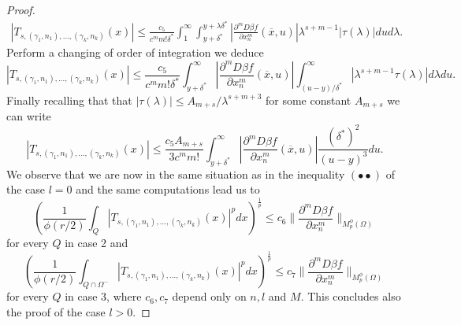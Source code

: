 \documentclass[12pt]{article}
\theoremstyle{definition}
\begin{document}
\begin{proof}
\begin{align*}
|T_{s,(\gamma_1,n_1),...,(\gamma_k,n_k)}(x) | \le \frac{c_5}{c^mm!\delta^*}\int_1^\infty \int_{y+\delta^*}^{y+\lambda \delta^*} \left|\frac{\partial^{m} D\beta f}{\partial x_n^{m} }(\overline x,u)\right |\lambda^{s+m-1} |\tau(\lambda)|du d\lambda.
\end{align*}
Perform a changing of order of integration we deduce
\[ |T_{s,(\gamma_1,n_1),...,(\gamma_k,n_k)}(x) | \le\frac{c_5}{c^mm!\delta^*}\int_{y+\delta^*}^{\infty} \left |\frac{\partial^{m} D\beta f}{\partial x_n^{m} }(\overline x,u)\right | \int_{(u-y)/\delta^*}^\infty |\lambda^{s+m-1} \tau(\lambda)| d\lambda du.\]
Finally recalling that that  $|\tau(\lambda)|\le A_{m+s}/\lambda^{s+m+3}$ for some constant $A_{m+s}$ we can write
\[ |T_{s,(\gamma_1,n_1),...,(\gamma_k,n_k)}(x) | \le\frac{c_5 A_{m+s}}{3c^mm!} \int_{y+\delta^*}^{\infty} \left |\frac{\partial^{m} D\beta f}{\partial x_n^{m} }(\overline x,u)\right | \frac{(\delta^*)^2}{(u-y)^3} du.\]
We observe that we are now in the same situation as in the inequality $(\bullet \bullet)$ of the case $l=0$ and the same computations lead us to
\[\left( \frac{1}{\phi(r/2)}\int_Q  \left| T_{s,(\gamma_1,n_1),...,(\gamma_k,n_k)}(x)\right|^p dx\right )^{\frac{1}{p}} \le c_6 \| \frac{\partial^{m} D\beta f}{\partial x_n^{m} } \|_{M_p^\phi(\Omega)} \] 
for every $Q$ in case 2  and
\[\left( \frac{1}{\phi(r/2)}\int_{Q\cap \Omega^-}  \left| T_{s,(\gamma_1,n_1),...,(\gamma_k,n_k)}(x)\right|^p dx\right )^{\frac{1}{p}} \le c_7 \| \frac{\partial^{m} D\beta f}{\partial x_n^{m} } \|_{M_p^\phi(\Omega)} \] 
for every $Q$ in case 3, where $c_6,c_7$ depend only on $n,l$ and $M$. This concludes also the proof of the case $l>0.$
\end{proof} 
\end{document}
